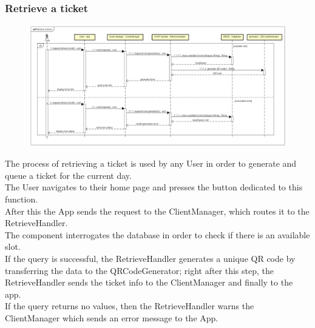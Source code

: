 \documentclass[table, 12pt]{article}
\begin{document}
\subsubsection{Retrieve a ticket}
\begin{figure}[H]
    \begin{center}
        \includegraphics[width=\textwidth]{assets/Sequence-Diagram/retrieve-a-ticket.png}
    \end{center}
\end{figure}
The process of retrieving a ticket is used by any User in order to generate and queue a ticket for the current day. \\
The User navigates to their home page and presses the button dedicated to this function.\\
After this the App sends the request to the ClientManager, which routes it to the RetrieveHandler. \\
The component interrogates the database in order to check if there is an available slot.\\
If the query is successful, the RetrieveHandler generates a unique QR code by transferring the data to the QRCodeGenerator; right after this step, the RetrieveHandler sends the ticket info to the ClientManager and finally to the app.\\
If the query returns no values, then the RetrieveHandler warns the ClientManager which sends an error message to the App.
\end{document}

